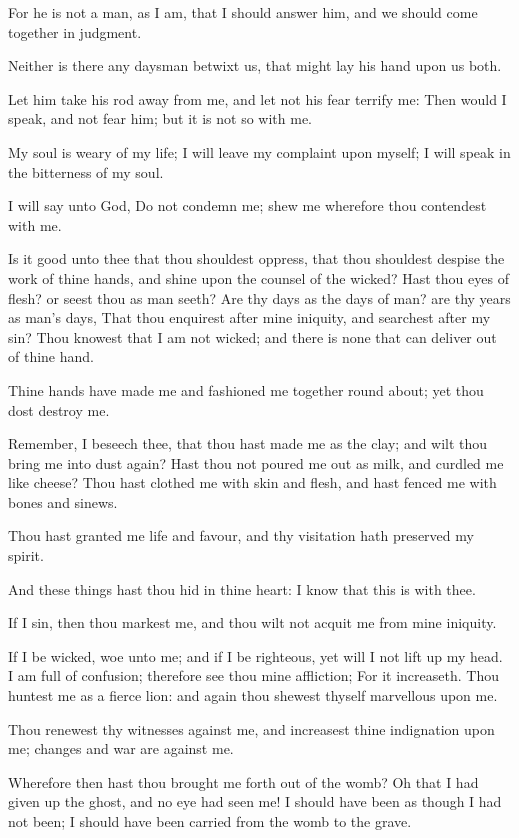 \Verse For he is not a man, as I am, that I should answer him, and we should come together in judgment.

\Verse Neither is there any daysman betwixt us, that might lay his hand upon us both.

\Verse Let him take his rod away from me, and let not his fear terrify me: \Verse Then would I speak, and not fear him; but it is not so with me.


\Chapter
\Verse My soul is weary of my life; I will leave my complaint upon myself; I will speak in the bitterness of my soul.

\Verse I will say unto God, Do not condemn me; shew me wherefore thou contendest with me.

\Verse Is it good unto thee that thou shouldest oppress, that thou shouldest despise the work of thine hands, and shine upon the counsel of the wicked?  \Verse Hast thou eyes of flesh? or seest thou as man seeth?  \Verse Are thy days as the days of man? are thy years as man's days, \Verse That thou enquirest after mine iniquity, and searchest after my sin?  \Verse Thou knowest that I am not wicked; and there is none that can deliver out of thine hand.

\Verse Thine hands have made me and fashioned me together round about; yet thou dost destroy me.

\Verse Remember, I beseech thee, that thou hast made me as the clay; and wilt thou bring me into dust again?  \Verse Hast thou not poured me out as milk, and curdled me like cheese?  \Verse Thou hast clothed me with skin and flesh, and hast fenced me with bones and sinews.

\Verse Thou hast granted me life and favour, and thy visitation hath preserved my spirit.

\Verse And these things hast thou hid in thine heart: I know that this is with thee.

\Verse If I sin, then thou markest me, and thou wilt not acquit me from mine iniquity.

\Verse If I be wicked, woe unto me; and if I be righteous, yet will I not lift up my head. I am full of confusion; therefore see thou mine affliction; \Verse For it increaseth. Thou huntest me as a fierce lion: and again thou shewest thyself marvellous upon me.

\Verse Thou renewest thy witnesses against me, and increasest thine indignation upon me; changes and war are against me.

\Verse Wherefore then hast thou brought me forth out of the womb? Oh that I had given up the ghost, and no eye had seen me!  \Verse I should have been as though I had not been; I should have been carried from the womb to the grave.

